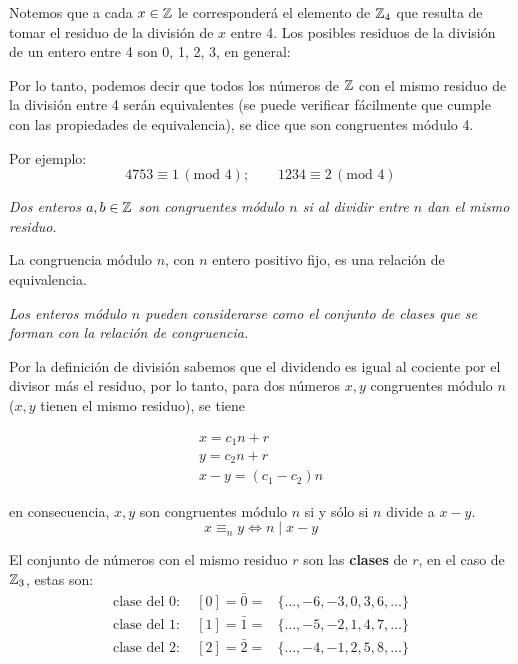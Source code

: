 \begin{figure}[H]
	\centering
	
	\caption{}
	\label{fig:relojconrecta}
\end{figure}

Notemos que a cada $x \in \mathbb{Z}$ le corresponderá el elemento de $\mathbb{Z}_4$ que resulta de tomar el residuo de la división de $x$ entre 4. Los posibles residuos de la división de un entero entre 4 son 0, 1, 2, 3, en general:

Por lo tanto, podemos decir que todos los números de $\mathbb{Z}$ con el mismo residuo de la división entre 4 serán equivalentes (se puede verificar fácilmente que cumple con las propiedades de equivalencia), se dice que son congruentes módulo 4.

Por ejemplo:
\[ 4753 \equiv 1 \, (\mbox{mod } 4); \qquad 1234 \equiv 2 \, (\mbox{mod } 4) \]

\emph{Dos enteros $a, b \in \mathbb{Z}$ son congruentes módulo $n$ si al dividir entre $n$ dan el mismo residuo}.

\begin{fmd-proposition}
	La congruencia módulo $n$, con $n$ entero positivo fijo, es una relación de equivalencia.
\end{fmd-proposition}

\emph{Los enteros módulo $n$ pueden considerarse como el conjunto de clases que se forman con la relación de congruencia.}

Por la definición de división sabemos que el dividendo es igual al cociente por el divisor más el residuo, por lo tanto, para dos números $x, y$ congruentes módulo $n$ ($x, y$ tienen el mismo residuo), se tiene

\[ \begin{array}{c}
	x = c_1n + r \\
	y = c_2n + r \\ \hline
	x - y = (c_1 - c_2)n
\end{array} \]

en consecuencia, $x, y$ son congruentes módulo $n$ si y sólo si $n$ divide a $x - y$.
\[ x \equiv_{n} y \iff n \mid x - y \]

El conjunto de números con el mismo residuo $r$ son las \textbf{clases} de $r$, en el caso de $\mathbb{Z}_3$, estas son:
\[ \begin{split}
	\mbox{clase del 0}: \quad [0] = \bar{0} =& \{\dots, -6, -3, 0, 3, 6, \dots \}\\
	\mbox{clase del 1}: \quad [1] = \bar{1} =& \{\dots, -5, -2, 1, 4, 7, \dots \}\\
	\mbox{clase del 2}: \quad [2] = \bar{2} =& \{\dots, -4, -1, 2, 5, 8, \dots \}\\
\end{split} \]

